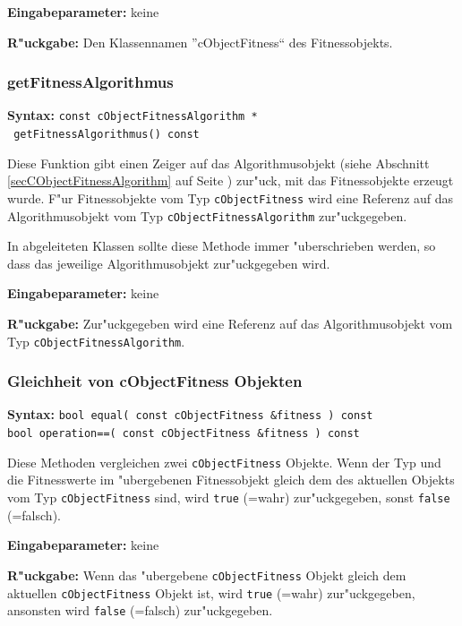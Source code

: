 \bigskip\noindent
\textbf{Eingabeparameter:} keine

\bigskip\noindent
\textbf{R"uckgabe:} Den Klassennamen ''cObjectFitness`` des Fitnessobjekts.


\subsubsection{getFitnessAlgorithmus}

\textbf{Syntax:} \verb|const cObjectFitnessAlgorithm * | \\\verb| getFitnessAlgorithmus() const|

\bigskip\noindent
Diese Funktion gibt einen Zeiger auf das Algorithmusobjekt (siehe Abschnitt \ref{secCObjectFitnessAlgorithm} auf Seite \pageref{secCObjectFitnessAlgorithm}) zur"uck, mit das Fitnessobjekte erzeugt wurde. F"ur Fitnessobjekte vom Typ \verb|cObjectFitness| wird eine Referenz auf das Algorithmusobjekt vom Typ \verb|cObjectFitnessAlgorithm| zur"uckgegeben.

In abgeleiteten Klassen sollte diese Methode immer "uberschrieben werden, so dass das jeweilige Algorithmusobjekt zur"uckgegeben wird.

\bigskip\noindent
\textbf{Eingabeparameter:} keine

\bigskip\noindent
\textbf{R"uckgabe:} Zur"uckgegeben wird eine Referenz auf das Algorithmusobjekt vom Typ \verb|cObjectFitnessAlgorithm|.


\subsubsection{Gleichheit von cObjectFitness Objekten}

\textbf{Syntax:} \verb|bool equal( const cObjectFitness &fitness ) const|\\
\verb|bool operation==( const cObjectFitness &fitness ) const|

\bigskip\noindent
Diese Methoden vergleichen zwei \verb|cObjectFitness| Objekte. Wenn der Typ und die Fitnesswerte im "ubergebenen Fitnessobjekt gleich dem des aktuellen Objekts vom Typ \verb|cObjectFitness| sind, wird \verb|true| (=wahr) zur"uckgegeben, sonst \verb|false| (=falsch).

\bigskip\noindent
\textbf{Eingabeparameter:} keine

\bigskip\noindent
\textbf{R"uckgabe:} Wenn das "ubergebene \verb|cObjectFitness| Objekt gleich dem aktuellen \verb|cObjectFitness| Objekt ist, wird \verb|true| (=wahr) zur"uckgegeben, ansonsten wird \verb|false| (=falsch) zur"uckgegeben.


